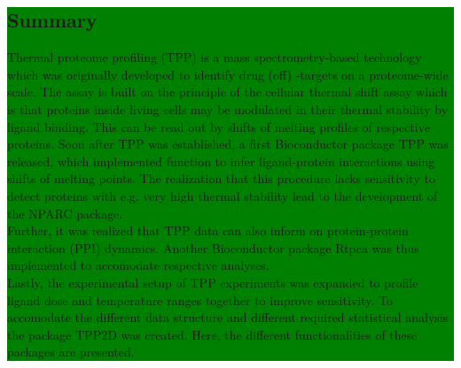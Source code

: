 \documentclass{article}
\newcommand{\hcode}[2][lgray]{{\ttfamily\color{vdgray}\colorbox{#1}{#2}}}
\begin{document}
\noindent
\colorbox{green}{
  \noindent
  \begin{minipage}[t]{\textwidth}
    \vspace{.15cm}
    \section*{\huge Summary}
    \large 
      Thermal proteome profiling (TPP) is a mass spectrometry-based 
      technology which was originally developed to identify drug (off)
      -targets on a proteome-wide scale. The assay is built on the principle
      of the cellular thermal shift assay which is that proteins inside living
      cells may be modulated in their thermal stability by ligand binding.
      This can be read out by shifts of melting profiles of respective proteins. 
      Soon after TPP was established, a first Bioconductor package \hcode{TPP} 
      was released, which implemented function to infer ligand-protein interactions
      using shifts of melting points. The realization that this procedure 
      lacks sensitivity to detect proteins with e.g. very high thermal stability lead 
      to the development of the \hcode{NPARC} package. \\
      Further, it was realized that TPP data can also inform on protein-protein 
      interaction (PPI) dynamics. Another Bioconductor package \hcode{Rtpca} was thus implemented
      to accomodate respective analyses. \\
      Lastly, the experimental setup of TPP experiments was expanded to profile ligand
      dose and temperature ranges together to improve sensitivity. To accomodate the 
      different data structure and different required statistical analysis the package
      \hcode{TPP2D} was created. Here, the different functionalities of these packages are presented. 
      
    \vspace{0.1cm}
  \end{minipage}
}
\vspace{-1cm}
\end{document}
